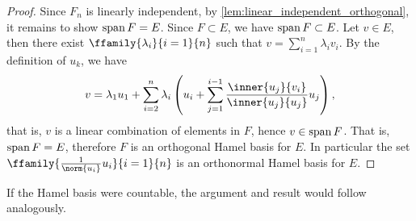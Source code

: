 \begin{proof}
    Since \(F_n\) is linearly independent, by \cref{lem:linear_independent_orthogonal}, it remains to show \(\operatorname{span}{F} = E\). Since \(F \subset E\), we have \(\operatorname{span}{F} \subset E\). Let \(v \in E\), then there exist \(\ffamily{\lambda_i}{i=1}{n}\) such that \(v = \sum_{i=1}^n \lambda_i v_i\). By the definition of \(u_k\), we have
    \begin{equation*}
        v = \lambda_1 u_1 + \sum_{i=2}^n \lambda_i\left(u_i + \sum_{j = 1}^{i-1} \frac{\inner{u_j}{v_i}}{\inner{u_j}{u_j}}u_j\right),
    \end{equation*}
    that is, \(v\) is a linear combination of elements in \(F\), hence \(v \in \operatorname{span}{F}\). That is, \(\operatorname{span}{F} = E\), therefore \(F\) is an orthogonal Hamel basis for \(E\). In particular the set \(\ffamily{\frac1{\norm{u_i}}u_i}{i=1}{n}\) is an orthonormal Hamel basis for \(E\).
\end{proof}
\begin{remark}
    If the Hamel basis were countable, the argument and result would follow analogously.
\end{remark}

